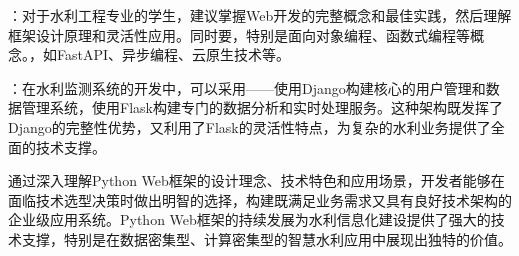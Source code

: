 ：对于水利工程专业的学生，建议掌握Web开发的完整概念和最佳实践，然后理解框架设计原理和灵活性应用。同时要，特别是面向对象编程、函数式编程等概念。，如FastAPI、异步编程、云原生技术等。

：在水利监测系统的开发中，可以采用------使用Django构建核心的用户管理和数据管理系统，使用Flask构建专门的数据分析和实时处理服务。这种架构既发挥了Django的完整性优势，又利用了Flask的灵活性特点，为复杂的水利业务提供了全面的技术支撑。

通过深入理解Python Web框架的设计理念、技术特色和应用场景，开发者能够在面临技术选型决策时做出明智的选择，构建既满足业务需求又具有良好技术架构的企业级应用系统。Python Web框架的持续发展为水利信息化建设提供了强大的技术支撑，特别是在数据密集型、计算密集型的智慧水利应用中展现出独特的价值。
